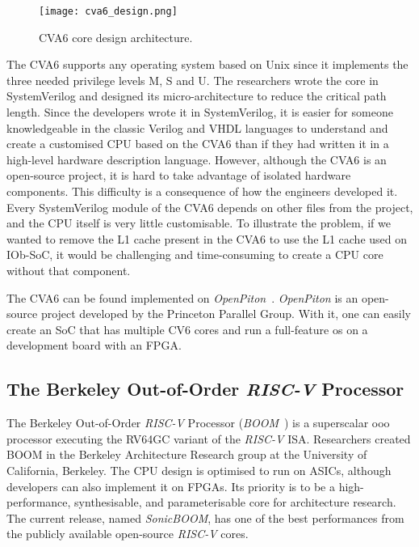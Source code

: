 \begin{figure}[!ht]
    \centering
    \texttt{[image: cva6\_design.png]}
    \caption{CVA6 core design architecture.}
    \label{fig:cva6_design}
\end{figure}

The CVA6 supports any operating system based on Unix since it implements the three needed privilege levels M, S and U. The researchers wrote the core in SystemVerilog and designed its micro-architecture to reduce the critical path length. Since the developers wrote it in SystemVerilog, it is easier for someone knowledgeable in the classic Verilog and VHDL languages to understand and create a customised CPU based on the CVA6 than if they had written it in a high-level hardware description language. However, although the CVA6 is an open-source project, it is hard to take advantage of isolated hardware components. This difficulty is a consequence of how the engineers developed it. Every SystemVerilog module of the CVA6 depends on other files from the project, and the CPU itself is very little customisable. To illustrate the problem, if we wanted to remove the L1 cache present in the CVA6 to use the L1 cache used on IOb-SoC, it would be challenging and time-consuming to create a CPU core without that component.

The CVA6 can be found implemented on \textit{OpenPiton}~\cite{Balkind:2016:OOS:2872362.2872414}. \textit{OpenPiton} is an open-source project developed by the Princeton Parallel Group. With it, one can easily create an SoC that has multiple CV6 cores and run a full-feature \acrfull{os} on a development board with an FPGA.

\subsection{The Berkeley Out-of-Order \textit{RISC-V} Processor}
The Berkeley Out-of-Order \textit{RISC-V} Processor (\textit{BOOM}~\cite{zhaosonicboom}) is a superscalar \acrfull{ooo} processor executing the RV64GC variant of the \textit{RISC-V} ISA. Researchers created BOOM in the Berkeley Architecture Research group at the University of California, Berkeley. The CPU design is optimised to run on ASICs, although developers can also implement it on FPGAs. Its priority is to be a high-performance, synthesisable, and parameterisable core for architecture research. The current release, named \textit{SonicBOOM}, has one of the best performances from the publicly available open-source \textit{RISC-V} cores.

